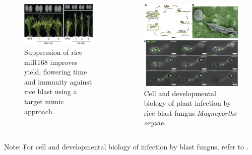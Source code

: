 \documentclass[10pt,dvipsnames,ignorenonframetext,aspectratio=169]{beamer}
\begin{document}
\begin{frame}{}
\protect\hypertarget{section-10}{}
\begin{columns}[T, onlytextwidth]

\begin{figure}
\includegraphics[width=0.9\linewidth]{../images/suppression_rice_miR168} \caption{Suppression of rice miR168 improves yield, flowering time and immunity against rice blast using a target mimic approach.}\label{fig:rice-blast-tolerance}
\end{figure}


\begin{figure}
\includegraphics[width=0.9\linewidth]{../images/biology_rice_blast_magnaporthe_infection} \caption{Cell and developmental biology of plant infection by rice blast fungus \textit{Magnaporthe oryzae}.}\label{fig:rice-blast-biology}
\end{figure}

\end{columns}

\footnotesize Note: For cell and developmental biology of infection by
blast fungus, refer to \citet{eseola2021investigating}.
\end{frame}
\end{document}
